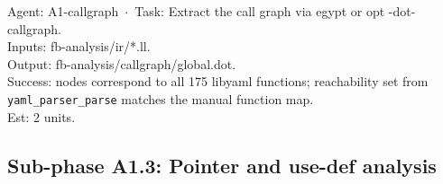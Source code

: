 \documentclass[12pt]{article}
\theoremstyle{definition}
\theoremstyle{remark}
\newenvironment{tasklist}{%
  \begingroup\raggedright
  \begin{description}[style=nextline, leftmargin=1.8cm, itemsep=0.4em]
}{%
  \end{description}
  \endgroup
}
\begin{document}
\begin{tasklist}
\item[T10.] {\ttfamily [~] Agent: A1-callgraph~$\cdot$~Task: Extract the call graph via egypt or opt -dot-callgraph.}\\
Inputs: fb-analysis/ir/*.ll.\\
Output: fb-analysis/callgraph/global.dot.\\
Success: nodes correspond to all 175 libyaml functions; reachability set from \verb|yaml_parser_parse| matches the manual function map.\\
Est: 2 units.

\end{tasklist}

\subsection{Sub-phase A1.3: Pointer and use-def analysis}
\end{document}

